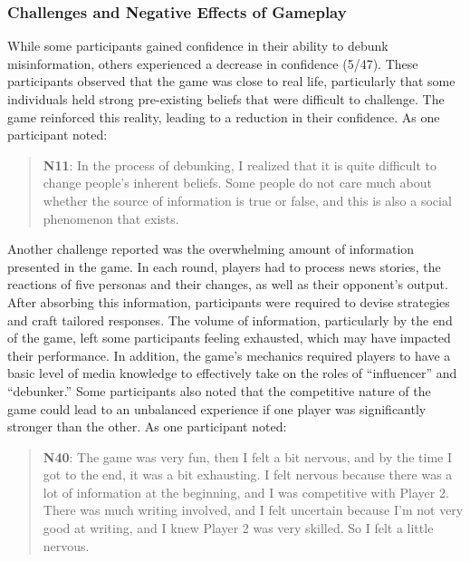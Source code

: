 \subsubsection{Challenges and Negative Effects of Gameplay}
While some participants gained confidence in their ability to debunk misinformation, others experienced a decrease in confidence (5/47). These participants observed that the game was close to real life, particularly that some individuals held strong pre-existing beliefs that were difficult to challenge. The game reinforced this reality, leading to a reduction in their confidence. As one participant noted: 
\begin{quote}
    \textbf{N11}:
    In the process of debunking, I realized that it is quite difficult to change people's inherent beliefs. Some people do not care much about whether the source of information is true or false, and this is also a social phenomenon that exists.
\end{quote}
Another challenge reported was the overwhelming amount of information presented in the game. In each round, players had to process news stories, the reactions of five personas and their changes, as well as their opponent’s output. After absorbing this information, participants were required to devise strategies and craft tailored responses. The volume of information, particularly by the end of the game, left some participants feeling exhausted, which may have impacted their performance.
In addition, the game’s mechanics required players to have a basic level of media knowledge to effectively take on the roles of “influencer” and “debunker.” Some participants also noted that the competitive nature of the game could lead to an unbalanced experience if one player was significantly stronger than the other.
As one participant noted:
\begin{quote}
    \textbf{N40}:
    The game was very fun, then I felt a bit nervous, and by the time I got to the end, it was a bit exhausting. I felt nervous because there was a lot of information at the beginning, and I was competitive with Player 2. There was much writing involved, and I felt uncertain because I’m not very good at writing, and I knew Player 2 was very skilled. So I felt a little nervous.
\end{quote}


